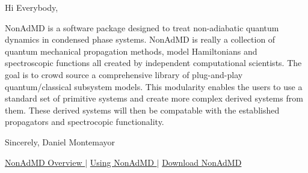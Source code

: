 Hi Everybody,

Non\+Ad\+M\+D is a software package designed to treat non-\/adiabatic quantum dynamics in condensed phase systems. Non\+Ad\+M\+D is really a collection of quantum mechanical propagation methods, model Hamiltonians and spectroscopic functions all created by independent computational scientists. The goal is to crowd source a comprehensive library of plug-\/and-\/play quantum/classical subsystem models. This modularity enables the users to use a standard set of primitive systems and create more complex derived systems from them. These derived systems will then be compatable with the established propagators and spectrocopic functionality.

Sincerely, Daniel Montemayor

\begin{center} \hyperlink{_overview}{Non\+Ad\+M\+D Overview } $\vert$ \hyperlink{_interface}{Using Non\+Ad\+M\+D } $\vert$ \hyperlink{_tags}{Download Non\+Ad\+M\+D } \end{center}  